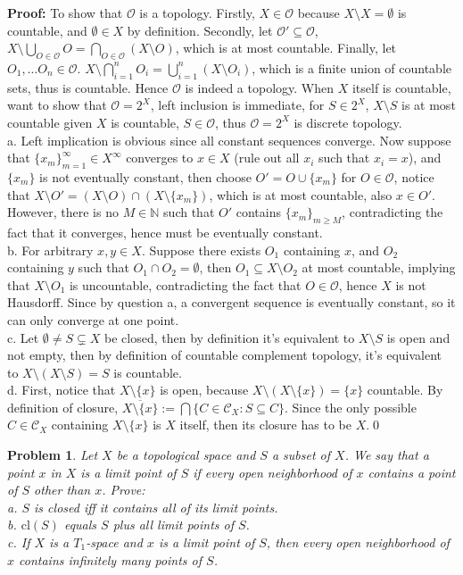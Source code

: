 \documentclass[12pt]{article}
\newtheorem{problem}{Problem}
\begin{document}
\textbf{Proof:} To show that $\mathcal{O}$ is a topology. Firstly, $X\in \mathcal{O}$ because $X\setminus X=\emptyset$ is countable, and $\emptyset\in X$ by definition. Secondly, let $\mathcal{O}'\subseteq \mathcal{O}$, $X\setminus\bigcup_{O\in\mathcal{O}}O = \bigcap_{O\in\mathcal{O}}(X\setminus O)$, which is at most countable. Finally, let $O_{1}, \dots O_{n}\in \mathcal{O}$. $X\setminus\bigcap_{i=1}^{n}O_{i}=\bigcup_{i=1}^{n}(X\setminus O_{i})$, which is a finite union of countable sets, thus is countable. Hence $\mathcal{O}$ is indeed a topology. When $X$ itself is countable, want to show that $\mathcal{O}=2^{X}$, left inclusion is immediate, for $S\in 2^{X}$, $X\setminus S$ is at most countable given $X$ is countable, $S\in\mathcal{O}$, thus $\mathcal{O}=2^{X}$ is discrete topology. \\
\indent a. Left implication is obvious since all constant sequences converge. Now suppose that $\{x_{m}\}_{m=1}^{\infty}\in X^{\infty}$ converges to $x\in X$ (rule out all $x_{i}$ such that $x_{i}=x$), and $\{x_{m}\}$ is not eventually constant, then choose $O' = O\cup\{x_{m}\}$ for $O\in\mathcal{O}$, notice that $X\setminus O' = (X\setminus O)\cap(X\setminus \{x_{m}\})$, which is at most countable, also $x\in O'$. However, there is no $M\in\mathbb{N}$ such that $O'$ contains $\{x_{m}\}_{m\geq M}$, contradicting the fact that it converges, hence must be eventually constant. \\
\indent b. For arbitrary $x,y\in X$. Suppose there exists $O_{1}$ containing $x$, and $O_{2}$ containing $y$ such that $O_{1}\cap O_{2}=\emptyset$, then $O_{1}\subseteq X\setminus O_{2}$ at most countable, implying that $X\setminus O_{1}$ is uncountable, contradicting the fact that $O\in\mathcal{O}$, hence $X$ is not Hausdorff. Since by question a, a convergent sequence is eventually constant, so it can only converge at one point. \\
\indent c. Let $\emptyset\neq S\subsetneq X$ be closed, then by definition it's equivalent to $X\setminus S$ is open and not empty, then by definition of countable complement topology, it's equivalent to $ X\setminus(X\setminus S) = S$ is countable. \\
\indent d. First, notice that $X\setminus\{x\}$ is open, because $X\setminus (X\setminus\{x\})=\{x\}$ countable. By definition of closure, $\overline{X\setminus\{x\}}:= \bigcap \{C\in \mathcal{C}_{X}: S\subseteq C\}$. Since the only possible $C\in\mathcal{C}_{X}$ containing $X\setminus\{x\}$ is $X$ itself, then its closure has to be $X$.\qed
\\
\begin{problem}
Let $X$ be a topological space and $S$ a subset of $X$. We say that a point $x$ in $X$ is a limit point of $S$ if every open neighborhood of $x$ contains a point of $S$ other than $x$. Prove: \\
\indent a. $S$ is closed iff it contains all of its limit points. \\
\indent b. $\text{cl}(S)$ equals $S$ plus all limit points of $S$. \\
\indent c. If $X$ is a $T_{1}$-space and $x$ is a limit point of $S$, then every open neighborhood of $x$ contains infinitely many points of $S$.
\end{problem}
\end{document}
